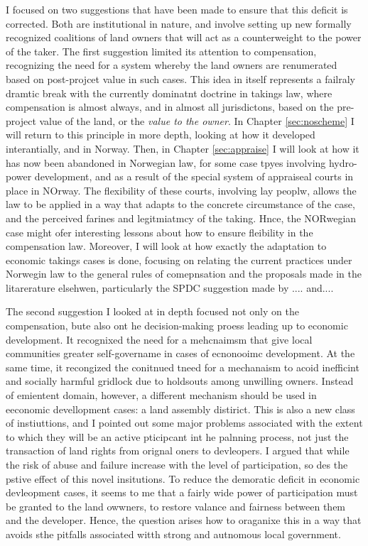 I focused on two suggestions that have been made to ensure that this deficit is corrected. Both are institutional in nature, and involve setting up new formally recognized coalitions of land owners that will act as a counterweight to the power of the taker. The first suggestion limited its attention to compensation, recognizing the need for a system whereby the land owners are renumerated based on post-projcet value in such cases. This idea in itself represents a failraly dramtic break with the currently dominatnt doctrine in takings law, where compensation is almost always, and in almost all jurisdictons, based on the pre-project value of the land, or the {\it value to the owner}. In Chapter \ref{sec:noscheme} I will return to this principle in more depth, looking at how it developed interantially, and in Norway. Then, in Chapter \ref{sec:appraise} I will look at how it has now been abandoned in Norwegian law, for some case tpyes involving hydro-power development, and as a result of the special system of appraiseal courts in place in NOrway. The flexibility of these courts, involving lay peoplw, allows the law to be applied in a way that adapts to the concrete circumstance of the case, and the perceived farines and legitmiatmcy of the taking. Hnce, the NORwegian case might ofer interesting lessons about how to ensure fleibility in the compensation law. Moreover, I will look at how exactly the adaptation to economic takings cases is done, focusing on relating the current practices under Norwegin law to the general rules of comepnsation and the proposals made in the litarerature elsehwen, particularly the SPDC suggestion made by .... and.... 

The second suggestion I looked at in depth focused not only on the compensation, bute also ont he decision-making proess leading up to economic development. It recognixed the need for a mehcnaimsm that give local communities greater self-govername in cases of ecnonooimc development. At the same time, it recongized the conitnued tneed for  a mechanaism to acoid inefficint and socially harmful gridlock due to holdsouts among unwilling owners. Instead of emientent domain, however, a different mechanism should be used in eeconomic devellopment cases: a land assembly distirict. This is also a new class of instiuttions, and I pointed out some major problems associated with the extent to which they will be an active pticipcant int he palnning process, not just the transaction of land rights from orignal oners to devleopers. I argued that while the risk of abuse and failure increase with the level of participation, so des the pstive effect of this novel insitutions. To reduce the demoratic deficit in economic devleopment cases, it seems to me that a fairly wide power of participation must be granted to the land owwners, to restore valance and fairness between them and the developer. Hence, the question arises how to oraganixe this in a way that avoids sthe pitfalls associated witth strong and autnomous local government. 

